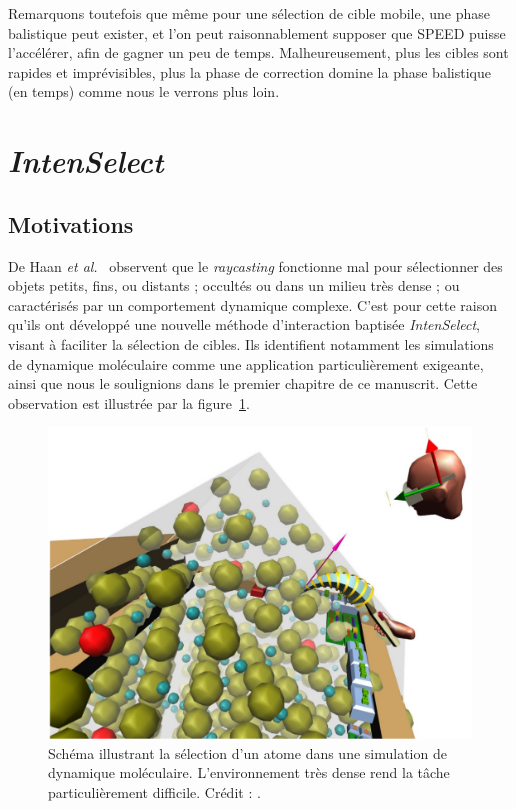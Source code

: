 	Remarquons toutefois que même pour une sélection de cible mobile, une phase balistique peut exister, et l'on peut raisonnablement supposer que SPEED puisse l'accélérer, afin de gagner un peu de temps. Malheureusement, plus les cibles sont rapides et imprévisibles, plus la phase de correction domine la phase balistique (en temps) comme nous le verrons plus loin.


\section{\emph{IntenSelect}}
	\subsection{Motivations}
	De Haan \emph{et al.}~\cite{de2005intenselect} observent que le \emph{raycasting} fonctionne mal pour sélectionner des objets petits, fins, ou distants ; occultés ou dans un milieu très dense ; ou caractérisés par un comportement dynamique complexe. C'est pour cette raison qu'ils ont développé une nouvelle méthode d'interaction baptisée \emph{IntenSelect}, visant à faciliter la sélection de cibles. Ils identifient notamment les simulations de dynamique moléculaire comme une application particulièrement exigeante, ainsi que nous le soulignions dans le premier chapitre de ce manuscrit. Cette observation est illustrée par la figure~\ref{fig:intensMD}.
	
	\begin{figure}[H]
		\centering
		\includegraphics[width=\textwidth]{figures/ch2/intensMD}
		\caption[Sélection d'un atome dans une simulation de dynamique moléculaire]{Schéma illustrant la sélection d'un atome dans une simulation de dynamique moléculaire. L'environnement très dense rend la tâche particulièrement difficile. Crédit : \cite{de2005intenselect}.}
		\label{fig:intensMD}
	\end{figure}

